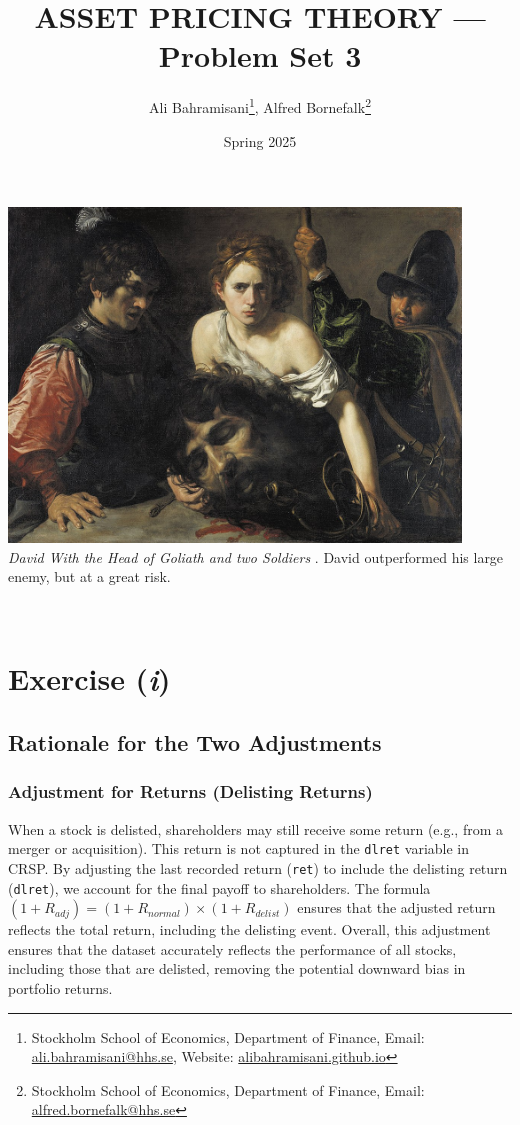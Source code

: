 \documentclass[a4paper,10pt,american]{article}
\title{ASSET PRICING THEORY --- Problem Set 3}
\author{Ali Bahramisani\thanks{Stockholm School
of Economics, Department of Finance, Email: 
\href{mailto:ali.bahramisani@hhs.se}{ali.bahramisani@hhs.se}, 
Website: \href{https://alibahramisani.github.io}{alibahramisani.github.io}},
Alfred Bornefalk\thanks{Stockholm School
of Economics, Department of Finance, Email: 
\href{mailto:alfred.bornefalk@hhs.se}{alfred.bornefalk@hhs.se}}}
\date{Spring 2025}
\begin{document}
\maketitle
\vspace{1cm}
    \begin{center}
        \includegraphics[width=0.9\textwidth]{DG.jpg} \\[1ex]
        {\footnotesize \textit{David With the Head of Goliath and two Soldiers} \citep{valentin_boulogne_david}. 
        David outperformed his large enemy, but at a great risk.}
    \end{center}
    \vfill



\newpage
{}

\section*{Exercise (\textit{i})}
\subsection*{Rationale for the Two Adjustments}
\subsubsection*{Adjustment for Returns (Delisting Returns)}
When a stock is delisted, shareholders may still receive some return 
(e.g., from a merger or acquisition). This return is not captured in the
\texttt{dlret} variable in CRSP. By adjusting the last recorded return 
(\texttt{ret}) to include the delisting return (\texttt{dlret}), 
we account for the final payoff to shareholders. The formula
$(1+R_{adj}) = (1+R_{normal})\times (1+R_{delist})$ ensures that the
adjusted return reflects the total return, including the delisting event.
Overall, this adjustment ensures that the dataset accurately reflects the 
performance of all stocks, including those that are delisted, removing the 
potential downward bias in portfolio returns.
\end{document}
